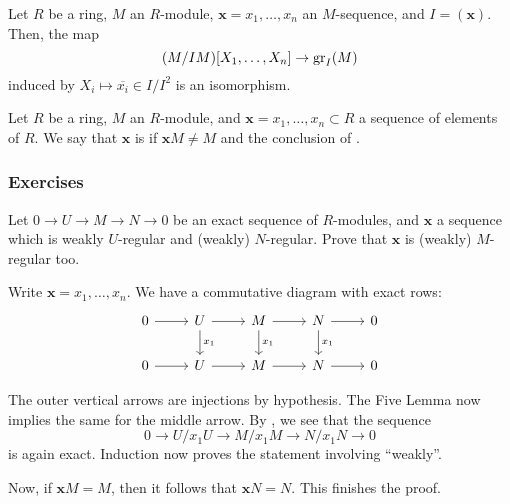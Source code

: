 \documentclass[12pt]{article}
\begin{document}
\begin{thm} \label{thm:regular-polynomial-graded-isomorphism}
	Let $R$ be a ring, $M$ an $R$-module, $\mathbf{x} = x_{1}, \ldots, x_{n}$ an $M$-sequence, and $I = (\mathbf{x})$. Then, the map
	\begin{equation*} 
		(M/IM)[X_{1}, \ldots, X_{n}] \to \operatorname{gr}_{I}(M)
	\end{equation*}
	induced by $X_{i} \mapsto \overline{x_{i}} \in I/I^{2}$ is an isomorphism.
\end{thm}

\begin{defn}
	Let $R$ be a ring, $M$ an $R$-module, and $\mathbf{x} = x_{1}, \ldots, x_{n} \subset R$ a sequence of elements of $R$. \newline
	We say that $\mathbf{x}$ is  if $\mathbf{x} M \neq M$ and the conclusion of .
\end{defn}

\subsubsection{Exercises}

\begin{exe}
	Let $0 \to U \to M \to N \to 0$ be an exact sequence of $R$-modules, and $\mathbf{x}$ a sequence which is weakly $U$-regular and (weakly) $N$-regular. Prove that $\mathbf{x}$ is (weakly) $M$-regular too.
\end{exe}
\begin{soln}
	Write $\mathbf{x} = x_{1}, \ldots, x_{n}$. We have a commutative diagram with exact rows:
	\begin{equation*} 
		\begin{tikzcd}
			0 \arrow[r] & U \arrow[d, "x_{1}"] \arrow[r] & M \arrow[d, "x_{1}"] \arrow[r] & N \arrow[d, "x_{1}"] \arrow[r] & 0 \\
			0 \arrow[r] & U \arrow[r] & M \arrow[r] & N \arrow[r] & 0
		\end{tikzcd}
	\end{equation*}

	The outer vertical arrows are injections by hypothesis. The Five Lemma now implies the same for the middle arrow. By , we see that the sequence
	\begin{equation*} 
		0 \to U/x_{1} U \to M/x_{1} M \to N/x_{1} N \to 0
	\end{equation*}
	is again exact. Induction now proves the statement involving ``weakly''.

	Now, if $\mathbf{x} M = M$, then it follows that $\mathbf{x} N = N$. This finishes the proof.
\end{soln}
\end{document}
